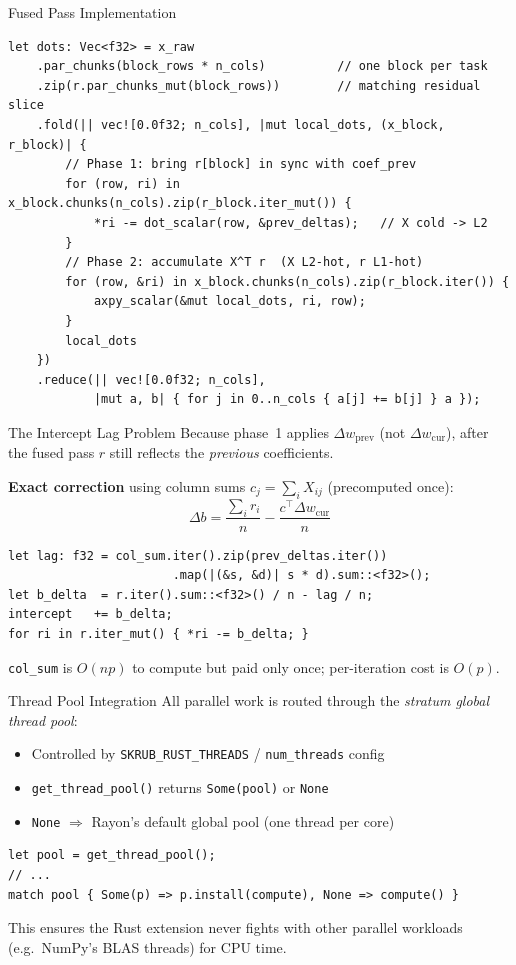 \documentclass[aspectratio=169]{beamer}
\begin{document}
\begin{frame}[fragile]{Fused Pass Implementation}
\begin{lstlisting}
let dots: Vec<f32> = x_raw
    .par_chunks(block_rows * n_cols)          // one block per task
    .zip(r.par_chunks_mut(block_rows))        // matching residual slice
    .fold(|| vec![0.0f32; n_cols], |mut local_dots, (x_block, r_block)| {
        // Phase 1: bring r[block] in sync with coef_prev
        for (row, ri) in x_block.chunks(n_cols).zip(r_block.iter_mut()) {
            *ri -= dot_scalar(row, &prev_deltas);   // X cold -> L2
        }
        // Phase 2: accumulate X^T r  (X L2-hot, r L1-hot)
        for (row, &ri) in x_block.chunks(n_cols).zip(r_block.iter()) {
            axpy_scalar(&mut local_dots, ri, row);
        }
        local_dots
    })
    .reduce(|| vec![0.0f32; n_cols],
            |mut a, b| { for j in 0..n_cols { a[j] += b[j] } a });
\end{lstlisting}
\end{frame}

\begin{frame}[fragile]{The Intercept Lag Problem}
  Because phase~1 applies $\Delta w_{\text{prev}}$ (not $\Delta w_{\text{cur}}$),
  after the fused pass $r$ still reflects the \emph{previous} coefficients.

  \vspace{0.4em}
  \textbf{Exact correction} using column sums $c_j = \sum_i X_{ij}$ (precomputed once):
  \[
    \Delta b = \frac{\sum_i r_i}{n} - \frac{c^\top \Delta w_{\text{cur}}}{n}
  \]
\begin{lstlisting}
let lag: f32 = col_sum.iter().zip(prev_deltas.iter())
                       .map(|(&s, &d)| s * d).sum::<f32>();
let b_delta  = r.iter().sum::<f32>() / n - lag / n;
intercept   += b_delta;
for ri in r.iter_mut() { *ri -= b_delta; }
\end{lstlisting}
  \vspace{0.2em}
  \texttt{col\_sum} is $O(np)$ to compute but paid only once; per-iteration cost is $O(p)$.
\end{frame}

\begin{frame}[fragile]{Thread Pool Integration}
  All parallel work is routed through the \emph{stratum global thread pool}:
  \begin{itemize}
    \item Controlled by \texttt{SKRUB\_RUST\_THREADS} / \texttt{num\_threads} config
    \item \texttt{get\_thread\_pool()} returns \texttt{Some(pool)} or \texttt{None}
    \item \texttt{None} $\Rightarrow$ Rayon's default global pool (one thread per core)
  \end{itemize}
  \vspace{0.4em}
\begin{lstlisting}
let pool = get_thread_pool();
// ...
match pool { Some(p) => p.install(compute), None => compute() }
\end{lstlisting}
  \vspace{0.4em}
  This ensures the Rust extension never fights with other parallel workloads
  (e.g.\ NumPy's BLAS threads) for CPU time.
\end{frame}
\end{document}
